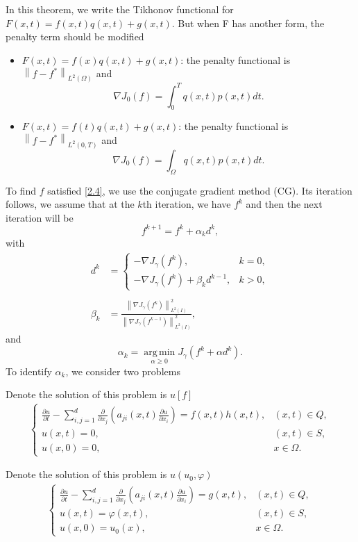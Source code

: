 \documentclass[]{article}
\begin{document}
\begin{cy}
	In this theorem, we write the Tikhonov functional for $F(x, t)=f(x, t)q(x, t)+g(x, t)$. But when F has another form, the penalty term should be modified
	\begin{itemize}
		\item $F(x, t)=f(x)q(x, t)+g(x, t)$: the penalty functional is $\left\|f-f^*\right\|_{L^2(\Omega)}$ and $$\nabla J_0(f)=\int_0^Tq(x, t)p(x, t)dt.$$
		\item $F(x, t)=f(t)q(x, t)+g(x, t)$: the penalty functional is $\left\|f-f^*\right\|_{L^2(0, T)}$ and $$\nabla J_0(f)=\int_\Omega q(x, t)p(x, t)dt.$$
	\end{itemize}
\end{cy}
\noindent To find $f$ satisfied \eqref{2.4}, we use the conjugate gradient method (CG). Its iteration follows, we assume that at the $k$th iteration, we have $f^k$ and then the next iteration will be
$$f^{k+1}=f^k+\alpha_kd^k,$$
with
\begin{align*}
	d^k&=\left\{\begin{array}{ll}
	-\nabla J_\gamma(f^k),& k=0,\\
	-\nabla J_\gamma(f^k)+\beta_kd^{k-1},& k>0,
	\end{array}\right.\\\\
	\beta_k&=\frac{\left\|\nabla J_\gamma (f^k)\right\|^2_{L^2(I)}}{\left\|\nabla J_\gamma (f^{k-1})\right\|^2_{L^2(I)}},
\end{align*}
and
$$\alpha_k=\operatorname*{arg\,min}_{\alpha\geq 0}J_\gamma(f^k+\alpha d^k).$$
To identify $\alpha_k$, we consider two problems
\begin{bt}\label{bt2.1}
	Denote the solution of this problem is $u[f]$
	\begin{align*}
		\begin{cases}
			\frac{\partial u}{\partial t}-\sum_{i, j=1}^{d}\frac{\partial}{\partial x_j}\left(a_{ji}(x, t)\frac{\partial u}{\partial x_i}\right)=f(x, t)h(x, t),&(x, t)\in Q,\\
			u(x, t)=0, & (x, t)\in S,\\
			u(x, 0)=0,&x\in \Omega.
		\end{cases}
	\end{align*}
\end{bt}
\begin{bt}\label{bt2.2}
	Denote the solution of this problem is $u(u_0, \varphi)$
	\begin{align*}
		\begin{cases}
			\frac{\partial u}{\partial t}-\sum_{i, j=1}^{d}\frac{\partial}{\partial x_j}\left(a_{ji}(x, t)\frac{\partial u}{\partial x_i}\right)=g(x, t),&(x, t)\in Q,\\
			u(x, t)=\varphi(x, t), & (x, t)\in S,\\
			u(x, 0)=u_0(x),&x\in \Omega.
		\end{cases}
	\end{align*}
\end{bt}
\end{document}
